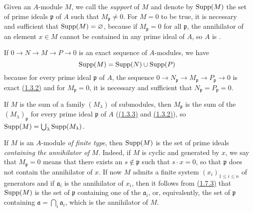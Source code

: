 \begin{env}[1.7.1]
\label{env-0.1.7.1}
Given an $A$-module $M$, we call the {\em support} of $M$ and denote by
${\mathop{\mathrm{Supp}}\nolimits}(M)$ the set of prime ideals $\mathfrak{p}$ of $A$ such that
$M_\mathfrak{p}\neq 0$. For $M=0$ to be true, it is necessary and sufficient
that ${\mathop{\mathrm{Supp}}\nolimits}(M)=\varnothing$, because if $M_\mathfrak{p}=0$ for all $\mathfrak{p}$, the
annihilator of an element $x\in M$ cannot be contained in any prime ideal of
$A$, so $A$ is .
\end{env}

\begin{env}[1.7.2]
\label{env-0.1.7.2}
If $0\to N\to M\to P\to 0$ is an exact sequence of $A$-modules, we have
\[
  {\mathop{\mathrm{Supp}}\nolimits}(M)={\mathop{\mathrm{Supp}}\nolimits}(N)\cup{\mathop{\mathrm{Supp}}\nolimits}(P)
\]
because for every prime ideal $\mathfrak{p}$ of $A$, the sequence
$0\to N_\mathfrak{p}\to M_\mathfrak{p}\to P_\mathfrak{p}\to 0$ is exact
\hyperref[env-0.1.3.2]{(1.3.2)} and for $M_\mathfrak{p}=0$, it is necessary and sufficient
that $N_\mathfrak{p}=P_\mathfrak{p}=0$.
\end{env}

\begin{env}[1.7.3]
\label{env-0.1.7.3}
If $M$ is the sum of a family $(M_\lambda)$ of submodules, then $M_\mathfrak{p}$
is the sum of the $(M_\lambda)_\mathfrak{p}$ for every prime ideal
$\mathfrak{p}$ of $A$ (\hyperref[env-0.1.3.3]{(1.3.3)} and \hyperref[env-0.1.3.2]{(1.3.2)}),
so ${\mathop{\mathrm{Supp}}\nolimits}(M)=\bigcup_\lambda{\mathop{\mathrm{Supp}}\nolimits}(M_\lambda)$.
\end{env}

\begin{env}[1.7.4]
\label{env-0.1.7.4}
If $M$ is an $A$-module {\em of finite type}, then ${\mathop{\mathrm{Supp}}\nolimits}(M)$ is the set of prime
ideals {\em containing the annihilator of} $M$. Indeed, if $M$ is cyclic and
generated by $x$, we say that $M_\mathfrak{p}=0$ means that there exists an
$s\not\in\mathfrak{p}$ such that $s\cdot x=0$, so that $\mathfrak{p}$ does not
contain the annihilator of $x$. If now $M$ admits a finite system
$(x_i)_{1\leqslant i\leqslant n}$ of generators and if $\mathfrak{a}_i$ is the
annihilator of $x_i$, then it follows from \hyperref[env-0.1.7.3]{(1.7.3)} that ${\mathop{\mathrm{Supp}}\nolimits}(M)$ is
the set of $\mathfrak{p}$ containing one of the $\mathfrak{a}_i$, or,
equivalently, the set of $\mathfrak{p}$ containing
$\mathfrak{a}=\bigcap_i\mathfrak{a}_i$, which is the annihilator of $M$.
\end{env}

